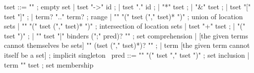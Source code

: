 \begin{syntax}
  tset ::= "\empty" ; empty set
       | tset "->" id ;
       | tset "." id ;
       | "*" tset ;
       | "&" tset ;
       | tset "[" tset "]" ;
       | term? ".." term? ; range
       | "\union" "(" tset ("," tset)* ")" ; union of location sets
       | "\inter" "(" tset ("," tset)* ")" ; intersection of location sets
       | tset "+" tset ;
       | "(" tset ")" ;
       | "{" tset "|" binders (";" pred)? "}" ; set comprehension
       | {[the given terms cannot themselves be sets] 
          "{" (tset ("," tset)*)? "}" };
       | term [the given term cannot itself be a set] ; implicit singleton
       \
  pred ::= "\subset" "(" tset "," tset ")" ; set inclusion
       | term "\in" tset ; set membership
\end{syntax}

